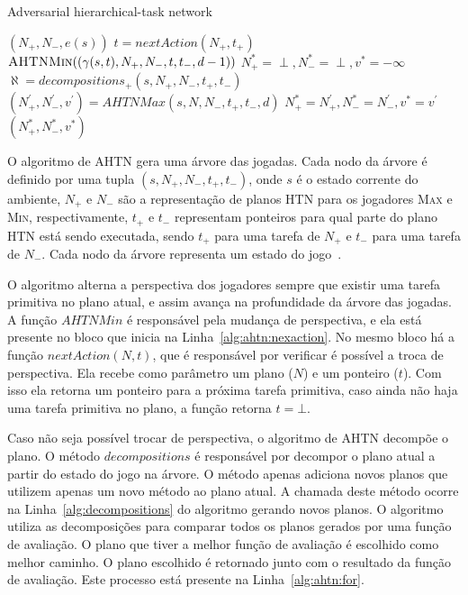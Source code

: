\begin{algorithm}
	\caption{Adversarial hierarchical-task network}
	\label{alg:ahtn}
	\begin{algorithmic}[1]		
		\label{alg:lin:firstLine}
		\State	\Return $(N_{+}, N_{-}, e(s))$
		\EndIf
		 \label{alg:ahtn:nexaction}
		\State $t = nextAction(N_{+}, t_{+})$ 
		\State \Return $\Call{AHTNMin}{(\gamma(s,t), N_{+}, N_{-}, t, t_{-}, d-1)}$ \label{alg:ahtn:troca}
		\EndIf
		\State $N_{+}^{*} = \perp, N_{-}^{*} = \perp, v^{*} = -\infty$
		\State $\aleph = decompositions_{+}(s, N_{+}, N_{-}, t_{+}, t_{-})$ \label{alg:decompositions}
		 \label{alg:ahtn:for}
		\State $(N^{'}_{+}, N^{'}_{-}, v^{'}) = AHTNMax(s, N, N_{-}, t_{+}, t_{-}, d)$
		\State $N_{+}^{*} = N^{'}_{+}, N_{-}^{*} = N^{'}_{-}, v^{*} = v^{'} $
		\EndIf
		\EndFor		
		\State \Return $(N_{+}^{*}, N_{-}^{*}, v^{*} )$
		\EndFunction
	\end{algorithmic}
\end{algorithm}

O algoritmo de AHTN gera uma árvore das jogadas. Cada nodo da árvore é definido por uma tupla $(s, N_{+}, N_{-}, t_{+}, t_{-})$, onde $s$ é o estado corrente do ambiente, $N_{+}$ e $N_{-}$ são a representação de planos HTN para os jogadores \textsc{Max} e \textsc{Min}, respectivamente, $t_{+}$ e $t_{-}$ representam ponteiros para qual parte do plano HTN está sendo executada, sendo $t_{+}$ para uma tarefa de $N_{+}$ e $t_{-}$ para uma tarefa de $N_{-}$. Cada nodo da árvore representa um estado do jogo~\cite{ontanon2015adversarial}.

O algoritmo alterna a perspectiva dos jogadores sempre que existir uma tarefa primitiva no plano atual, e assim avança na profundidade da árvore das jogadas. A função $AHTNMin$ é responsável pela mudança de perspectiva, e ela está presente no bloco que inicia na Linha~\ref{alg:ahtn:nexaction}. No mesmo bloco há a função $nextAction(N,t)$, que é responsável por verificar é possível a troca de perspectiva. Ela recebe como parâmetro um plano ($N$) e um ponteiro ($t$). Com isso ela retorna um ponteiro para a próxima tarefa primitiva, caso ainda não haja uma tarefa primitiva no plano, a função retorna $t = \bot$.

Caso não seja possível trocar de perspectiva, o algoritmo de AHTN decompõe o plano. O método $decompositions$ é responsável por decompor o plano atual a partir do estado do jogo na árvore. O método apenas adiciona novos planos que utilizem apenas um novo método ao plano atual. A chamada deste método ocorre na Linha~\ref{alg:decompositions} do algoritmo gerando novos planos.
O algoritmo utiliza as decomposições para comparar todos os planos gerados por uma função de avaliação. O plano que tiver a melhor função de avaliação é escolhido como melhor caminho. O plano escolhido é retornado junto com o resultado da função de avaliação. Este processo está presente na Linha~\ref{alg:ahtn:for}.

